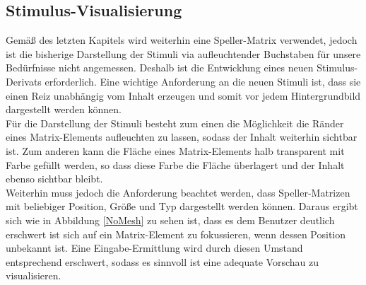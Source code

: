 \pagebreak
\subsection{Stimulus-Visualisierung}
\vspace{0.3cm}

Gemäß des letzten Kapitels wird weiterhin eine Speller-Matrix verwendet, 
jedoch ist die bisherige Darstellung der Stimuli via aufleuchtender Buchstaben für unsere Bedürfnisse nicht angemessen.
Deshalb ist die Entwicklung eines neuen Stimulus-Derivats erforderlich.
Eine wichtige Anforderung an die neuen Stimuli ist, dass sie einen Reiz unabhängig vom Inhalt erzeugen und somit vor jedem Hintergrundbild dargestellt werden können.\\

Für die Darstellung der Stimuli besteht zum einen die Möglichkeit die Ränder eines Matrix-Elements aufleuchten zu lassen, sodass der Inhalt weiterhin sichtbar ist.
Zum anderen kann die Fläche eines Matrix-Elements halb transparent mit Farbe gefüllt werden, so dass diese Farbe die Fläche überlagert und der Inhalt ebenso sichtbar bleibt.\\

Weiterhin muss jedoch die Anforderung beachtet werden, dass Speller-Matrizen mit beliebiger Position, Größe und Typ dargestellt werden können.
Daraus ergibt sich wie in Abbildung \ref{NoMesh} zu sehen ist, dass es dem Benutzer deutlich erschwert ist sich auf ein Matrix-Element zu fokussieren, wenn dessen Position unbekannt ist.
Eine Eingabe-Ermittlung wird durch diesen Umstand entsprechend erschwert, sodass es sinnvoll ist eine adequate Vorschau zu visualisieren.

